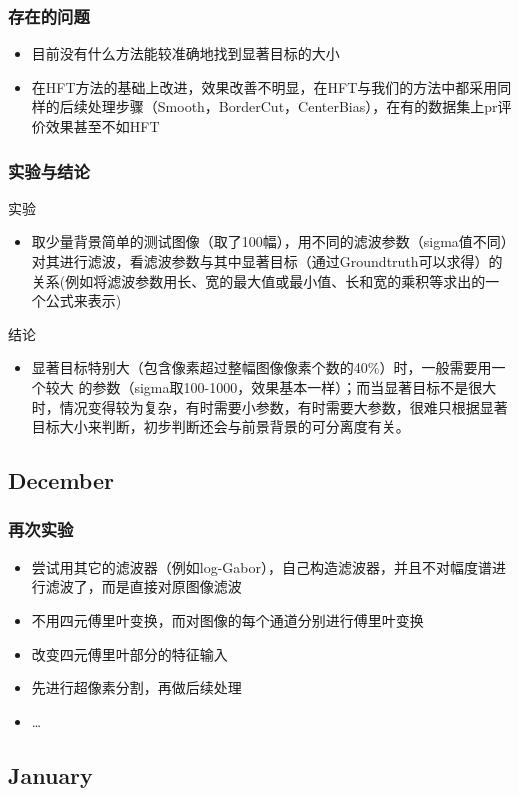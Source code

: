 \documentclass[notheorems,mathserif,table,compress]{beamer}  %
\begin{document}
\begin{frame}
\frametitle{存在的问题}
\begin{itemize}
\item 目前没有什么方法能较准确地找到显著目标的大小
\item 在HFT方法的基础上改进，效果改善不明显，在HFT与我们的方法中都采用同样的后续处理步骤（Smooth，BorderCut，CenterBias），在有的数据集上pr评价效果甚至不如HFT
\end{itemize}
\end{frame}


\begin{frame}
\frametitle{实验与结论}
实验
\begin{itemize}
\item 取少量背景简单的测试图像（取了100幅），用不同的滤波参数（sigma值不同）对其进行滤波，看滤波参数与其中显著目标（通过Groundtruth可以求得）的关系(例如将滤波参数用长、宽的最大值或最小值、长和宽的乘积等求出的一个公式来表示)
\end{itemize}
结论
\begin{itemize}
\item 显著目标特别大（包含像素超过整幅图像像素个数的40\%）时，一般需要用一个较大 的参数（sigma取100-1000，效果基本一样）；而当显著目标不是很大时，情况变得较为复杂，有时需要小参数，有时需要大参数，很难只根据显著目标大小来判断，初步判断还会与前景背景的可分离度有关。
\end{itemize}
\end{frame}


\subsection{December}

\begin{frame}
\frametitle{再次实验}
\begin{itemize}
\item 尝试用其它的滤波器（例如log-Gabor），自己构造滤波器，并且不对幅度谱进行滤波了，而是直接对原图像滤波
\item 不用四元傅里叶变换，而对图像的每个通道分别进行傅里叶变换
\item 改变四元傅里叶部分的特征输入
\item 先进行超像素分割，再做后续处理
\item \ldots
\end{itemize}
\end{frame}

\subsection{January}
\end{document}
